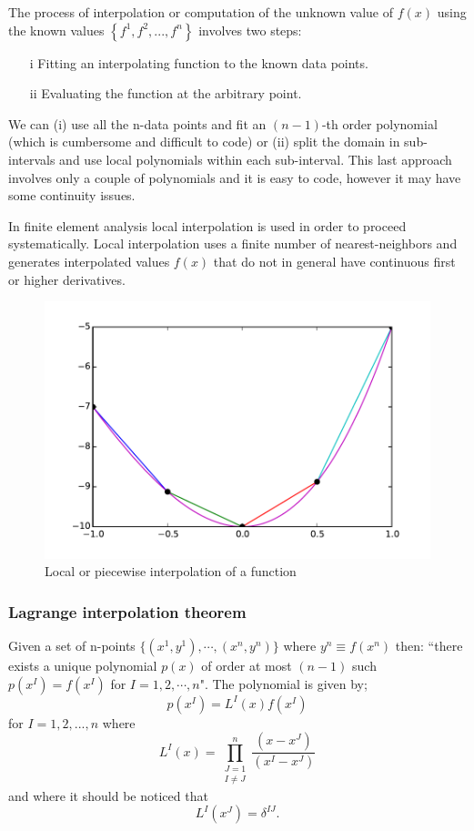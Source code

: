 The process of interpolation or computation of the unknown value of $f(x)$ using the known values $\left\{ {{f^1},{f^2},...,{f^n}} \right\}$ involves two steps:

\begin{itemize}
\item[i]  Fitting an interpolating function to the known data points.
\item[ii] Evaluating the function at the arbitrary point.
\end{itemize}

We can (i) use all the n-data points and fit an $(n-1)$-th order polynomial (which is cumbersome and difficult to code) or (ii) split the domain in sub-intervals and use local polynomials within each sub-interval. This last approach involves only a couple of polynomials and it is easy to code, however it may have some continuity issues.

In finite element analysis local interpolation is used in order to proceed systematically. Local interpolation uses a finite number of nearest-neighbors and generates interpolated values $f(x)$ that do not in general have continuous first or higher derivatives.

\begin{figure}[h]
\centering
\includegraphics[width=12cm]{img/interpol2.pdf}
\caption{Local or piecewise interpolation of a function}
\label{fig:interpol2}
\end{figure}

\subsubsection{Lagrange interpolation theorem}
Given a set of n-points $\{ (x^1, y^1),\cdots,(x^n, y^n)\}$ where $y^n \equiv f({x^n})$ then: ``there exists a unique polynomial $p(x)$ of order at most $(n-1)$ such $p(x^I) = f(x^I)$ for $I=1,2,\cdots,n$". The polynomial is given by;
\begin{equation}\label{eq:pol}
  p(x^I) = L^I(x) f(x^I)  
\end{equation}
for $I=1,2,...,n$ where
\begin{equation}\label{eq:coef}
  L^I(x) = \prod_{\substack{J = 1\\ I \ne J}}^n \frac{(x - x^J)}{(x^I - x^J)}
\end{equation}
and where it should be noticed that
\[L^I(x^J) = \delta^{IJ}.\]

